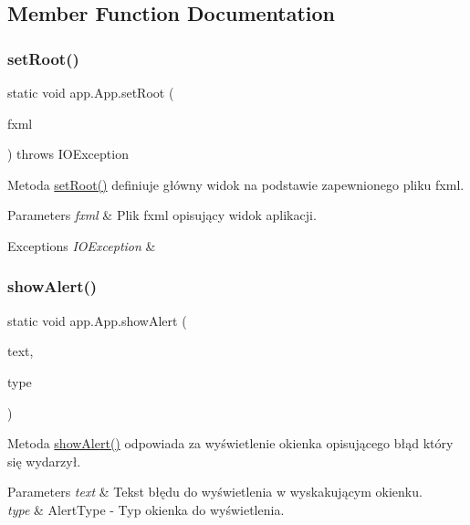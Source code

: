 \subsection{Member Function Documentation}
\mbox{\label{classapp_1_1_app_a4e35071c95df2c529a8d236b7a802dcf}} 
\subsubsection{\texorpdfstring{setRoot()}{setRoot()}}
{\footnotesize\ttfamily static void app.\+App.\+set\+Root (\begin{DoxyParamCaption}\item[{String}]{fxml }\end{DoxyParamCaption}) throws I\+O\+Exception\hspace{0.3cm}{\ttfamily [static]}}

Metoda \mbox{\hyperlink{classapp_1_1_app_a4e35071c95df2c529a8d236b7a802dcf}{set\+Root()}} definiuje główny widok na podstawie zapewnionego pliku fxml. 
\begin{DoxyParams}{Parameters}
{\em fxml} & Plik fxml opisujący widok aplikacji. \\
\hline
\end{DoxyParams}

\begin{DoxyExceptions}{Exceptions}
{\em I\+O\+Exception} & \\
\hline
\end{DoxyExceptions}
\mbox{\label{classapp_1_1_app_a2fe1147fd5157293f36f43ef710f9612}} 
\subsubsection{\texorpdfstring{showAlert()}{showAlert()}}
{\footnotesize\ttfamily static void app.\+App.\+show\+Alert (\begin{DoxyParamCaption}\item[{String}]{text,  }\item[{Alert.\+Alert\+Type}]{type }\end{DoxyParamCaption})\hspace{0.3cm}{\ttfamily [static]}}

Metoda \mbox{\hyperlink{classapp_1_1_app_a2fe1147fd5157293f36f43ef710f9612}{show\+Alert()}} odpowiada za wyświetlenie okienka opisującego błąd który się wydarzył. 
\begin{DoxyParams}{Parameters}
{\em text} & Tekst błędu do wyświetlenia w wyskakującym okienku. \\
\hline
{\em type} & Alert\+Type -\/ Typ okienka do wyświetlenia. \\
\hline
\end{DoxyParams}
\mbox{\label{classapp_1_1_app_a00c8fa7be9652a98d9663d7e89e4e6a3}} 
